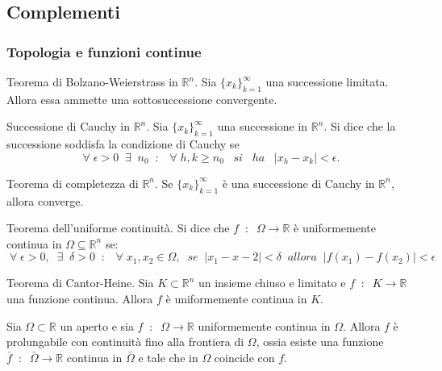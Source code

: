 \subsection*{Complementi}
\subsubsection*{Topologia e funzioni continue}
Teorema di Bolzano-Weierstrass in $\mathbb{R}^n$. Sia $\{x_k\}_{k=1}^\infty$ una successione limitata. Allora essa ammette una sottosuccessione convergente.\newline

Successione di Cauchy in $\mathbb{R}^n$. Sia $\{x_k\}_{k=1}^\infty$ una successione in $\mathbb{R}^n$. Si dice che la successione soddisfa la condizione di Cauchy se
\[
    \;\forall\;\epsilon > 0 \;\;\exists\;\; n_0 \;\;:\;\;\;\forall\;h,k \geq n_0 \;\;\; si \;\;\; ha \;\;\;|x_h -x_k|<\epsilon.
\]
\newline

Teorema di completezza di $\mathbb{R}^n$. Se $\{x_k\}_{k=1}^\infty$ è una successione di Cauchy in $\mathbb{R}^n$, allora converge.\newline

Teorema dell'uniforme continuità. Si dice che $f \;\;:\;\; \Omega \rightarrow \mathbb{R}$ è uniformemente continua in $\Omega \subseteq \mathbb{R}^n$ se:
\[
    \;\forall\;\epsilon>0,\;\;\exists\;\;\delta>0 \;\;:\;\; \;\forall\;x_1,x_2 \in\Omega,\;\;se \;\; |x_1- x-2| <\delta \;\;allora \;\;|f(x_1) -f(x_2)|<\epsilon
\]
\newline

Teorema di Cantor-Heine. Sia $K\subset \mathbb{R}^n$ un insieme chiuso e limitato e $f \;\;:\;\; K \rightarrow \mathbb{R}$ una funzione continua. Allora $f$ è uniformemente continua in $K$.\newline

Sia $\Omega \subset \mathbb{R}$ un aperto e sia $f \;\;:\;\; \Omega \rightarrow \mathbb{R}$ uniformemente continua in $\Omega$. Allora $f$ è prolungabile con continuità fino alla frontiera di $\Omega$, ossia esiste una funzione $\bar{f} \;\;:\;\; \bar{\Omega} \rightarrow \mathbb{R}$ continua in $\bar{\Omega}$ e tale che in $\Omega$ coincide con $f$.

